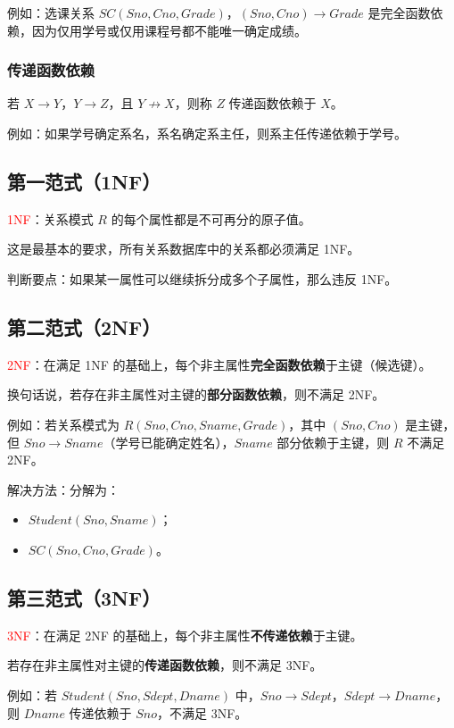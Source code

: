 \documentclass{../../note}
\begin{document}
例如：选课关系 $SC(Sno, Cno, Grade)$，$(Sno, Cno) \to Grade$ 是完全函数依赖，因为仅用学号或仅用课程号都不能唯一确定成绩。

\subsubsection{传递函数依赖}

若 $X \to Y$，$Y \to Z$，且 $Y \not\to X$，则称 $Z$ 传递函数依赖于 $X$。

例如：如果学号确定系名，系名确定系主任，则系主任传递依赖于学号。

\subsection{第一范式（1NF）}

\textcolor{red}{1NF}：关系模式 $R$ 的每个属性都是不可再分的原子值。

这是最基本的要求，所有关系数据库中的关系都必须满足 1NF。

判断要点：如果某一属性可以继续拆分成多个子属性，那么违反 1NF。

\subsection{第二范式（2NF）}

\textcolor{red}{2NF}：在满足 1NF 的基础上，每个非主属性\textbf{完全函数依赖}于主键（候选键）。

换句话说，若存在非主属性对主键的\textbf{部分函数依赖}，则不满足 2NF。

例如：若关系模式为 $R(Sno, Cno, Sname, Grade)$，其中 $(Sno, Cno)$ 是主键，但 $Sno \to Sname$（学号已能确定姓名），$Sname$ 部分依赖于主键，则 $R$ 不满足 2NF。

解决方法：分解为：
\begin{itemize}
  \item $Student(Sno, Sname)$；
  \item $SC(Sno, Cno, Grade)$。
\end{itemize}

\subsection{第三范式（3NF）}

\textcolor{red}{3NF}：在满足 2NF 的基础上，每个非主属性\textbf{不传递依赖}于主键。

若存在非主属性对主键的\textbf{传递函数依赖}，则不满足 3NF。

例如：若 $Student(Sno, Sdept, Dname)$ 中，$Sno \to Sdept$，$Sdept \to Dname$，则 $Dname$ 传递依赖于 $Sno$，不满足 3NF。
\end{document}

